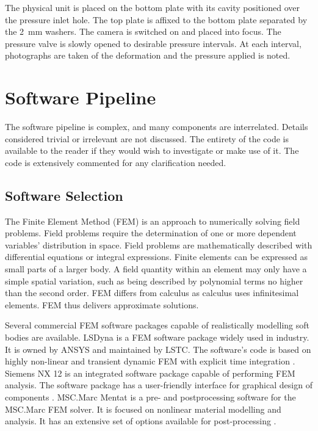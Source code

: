 The physical unit is placed on the bottom plate with its cavity positioned over the pressure inlet hole. The top plate is affixed to the bottom plate separated by the \SI{2}{mm} washers. The camera is switched on and placed into focus. The pressure valve is slowly opened to desirable pressure intervals. At each interval, photographs are taken of the deformation and the pressure applied is noted.

\section{Software Pipeline}
\label{sec:SW}

The software pipeline is complex, and many components are interrelated. Details considered trivial or irrelevant are not discussed. The entirety of the code is available to the reader if they would wish to investigate or make use of it. The code is extensively commented for any clarification needed.

\subsection{Software Selection}

The Finite Element Method (FEM) is an approach to numerically solving field problems. Field problems require the determination of one or more dependent variables' distribution in space. Field problems are mathematically described with differential equations or integral expressions. Finite elements can be expressed as small parts of a larger body. A field quantity within an element may only have a simple spatial variation, such as being described by polynomial terms no higher than the second order. FEM differs from calculus as calculus uses infinitesimal elements. FEM thus delivers approximate solutions. \citep{Cook2002}

Several commercial FEM software packages capable of realistically modelling soft bodies are available. LSDyna is a FEM software package widely used in industry. It is owned by ANSYS and maintained by LSTC. The software's code is based on highly non-linear and transient dynamic FEM with explicit time integration \citep{LSDyna}. Siemens NX 12 is an integrated software package capable of performing FEM analysis. The software package has a user-friendly interface for graphical design of components \citep{NX12}. MSC.Marc Mentat is a pre- and postprocessing software for the MSC.Marc FEM solver. It is focused on nonlinear material modelling and analysis. It has an extensive set of options available for post-processing \citep{MSC}.

